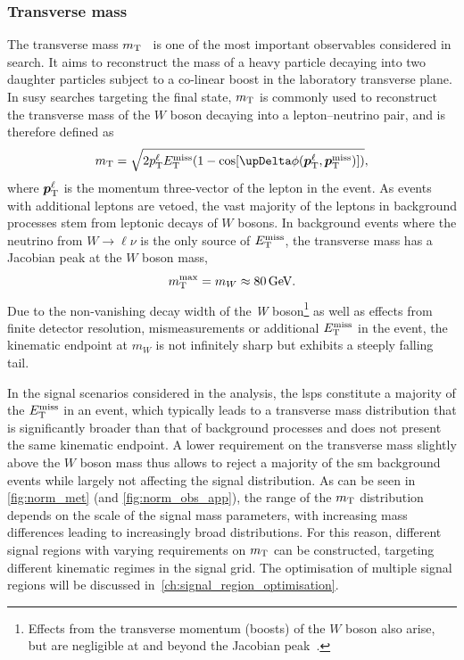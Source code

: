 \subsubsection{Transverse mass}

The transverse mass $m_{\textrm{T}}$~\cite{Arnison:1983rp,transversemass:163856} is one of the most important observables considered in \onelepton search. It aims to reconstruct the mass of a heavy particle decaying into two daughter particles subject to a co-linear boost in the laboratory transverse plane. In \gls{susy} searches targeting the \onelepton final state, $m_{\textrm{T}}$ is commonly used to reconstruct the transverse mass of the $W$ boson decaying into a lepton--neutrino pair, and is therefore defined as
\begin{equation}
	\mt = \sqrt{2\pt^\ell\etmiss(1-\cos[\upDelta\phi(\makemebold{p}_\mathrm{T}^\ell,\makemebold{p}_\mathrm{T}^\mathrm{miss})])},
\end{equation}
where $\makemebold{p}_\mathrm{T}^\ell$ is the momentum three-vector of the lepton in the event. As events with additional leptons are vetoed, the vast majority of the leptons in background processes stem from leptonic decays of $W$ bosons. In background events where the neutrino from $W\rightarrow\ell\nu$ is the only source of $E_{\textrm{T}}^{\textrm{miss}}$, the transverse mass has a Jacobian peak at the $W$ boson mass, 
\begin{equation}
	\mt^\mathrm{max} = m_W \approx \SI{80}{\GeV}.
\end{equation}
Due to the non-vanishing decay width of the \textit{W} boson\footnote{Effects from the transverse momentum (\ie boosts) of the $W$ boson also arise, but are negligible at and beyond the Jacobian peak~\cite{Baur:2003jy,Smith:1983aa}.} as well as effects from finite detector resolution, mismeasurements or additional $E_{\textrm{T}}^{\textrm{miss}}$ in the event, the kinematic endpoint at $m_W$ is not infinitely sharp but exhibits a steeply falling tail.

In the signal scenarios considered in the analysis, the \glspl{lsp} constitute a majority of the $E_{\textrm{T}}^{\textrm{miss}}$ in an event, which typically leads to a transverse mass distribution that is significantly broader than that of background processes and does not present the same kinematic endpoint. A lower requirement on the transverse mass slightly above the $W$ boson mass thus allows to reject a majority of the \gls{sm} background events while largely not affecting the signal distribution. As can be seen in \cref{fig:norm_met} (and \cref{fig:norm_obs_app}), the range of the $m_{\textrm{T}}$ distribution depends on the scale of the signal mass parameters, with increasing mass differences leading to increasingly broad distributions. For this reason, different signal regions with varying requirements on $m_{\textrm{T}}$ can be constructed, targeting different kinematic regimes in the signal grid. The optimisation of multiple signal regions will be discussed in~\cref{ch:signal_region_optimisation}.

